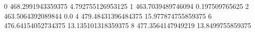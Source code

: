 0 468.2991943359375 4.792755126953125
1 463.7039489746094 0.197509765625
2 463.5064392089844 0.0
4 479.48431396484375 15.977874755859375
6 476.64154052734375 13.135101318359375
8 477.3564147949219 13.8499755859375
